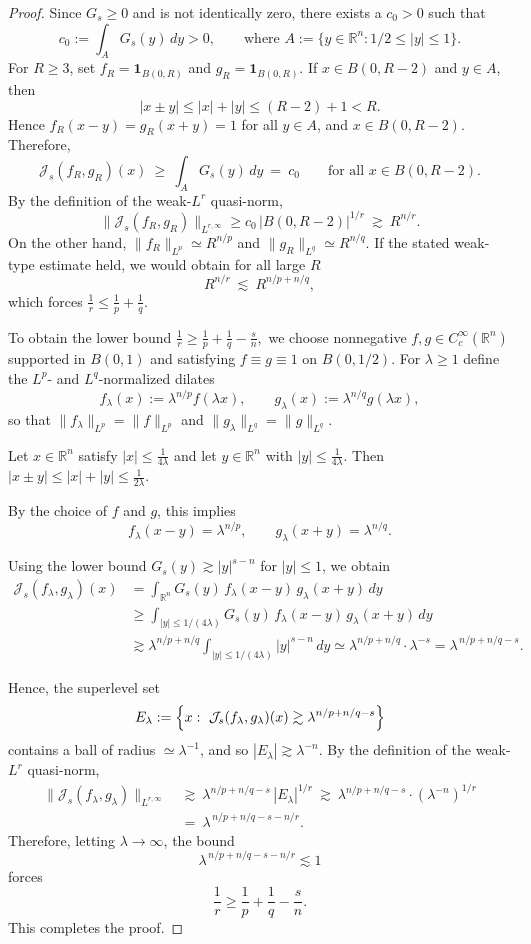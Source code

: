 \documentclass[12pt]{article}
\theoremstyle{definition}
\theoremstyle{remark}
\numberwithin{equation}{section}
\begin{document}
\begin{proof}
Since $G_s\ge 0$ and is not identically zero, there exists a $c_0>0$ such that
\[
c_0:=\int_A G_s(y)\,dy>0,\qquad\text{where } A:=\{y\in\mathbb R^n: 1/2\le |y|\le 1\}.
\]
For $R\ge 3$, set $f_R=\mathbf 1_{B(0,R)}$ and $g_R=\mathbf 1_{B(0,R)}$.
If $x\in B(0,R-2)$ and $y\in A$, then
\[
|x\pm y|\le |x|+|y|\le (R-2)+1<R.
\]
Hence $f_R(x-y)=g_R(x+y)=1$ for all $y\in A$, and $x\in B(0, R-2).$ Therefore,
\[
\mathcal J_s(f_R,g_R)(x)\ \ge\ \int_A G_s(y)\,dy\ =\ c_0
\qquad\text{for all }x\in B(0,R-2).
\]
By the definition of the weak-$L^r$ quasi-norm,
\[
\|\mathcal J_s(f_R,g_R)\|_{L^{r,\infty}}
\ge c_0\,|B(0,R-2)|^{1/r}\ \gtrsim\ R^{n/r}.
\]
On the other hand, $\|f_R\|_{L^p}\simeq R^{n/p}$ and $\|g_R\|_{L^q}\simeq R^{n/q}$.
If the stated weak-type estimate held, we would obtain for all large $R$
\[
R^{n/r}\ \lesssim\ R^{n/p+n/q},
\]
which forces $\frac1r\le \frac1p+\frac1q$.

To obtain the lower bound
\(
\frac1r \ge \frac1p+\frac1q-\frac{s}{n},
\)
we choose nonnegative $f,g\in C_c^\infty(\mathbb R^n)$ supported in $B(0,1)$ and satisfying
$f\equiv g\equiv 1$ on $B(0,1/2)$. For $\lambda\ge 1$ define the $L^p$- and $L^q$-normalized dilates
\[
f_\lambda(x):=\lambda^{n/p}f(\lambda x),
\qquad
g_\lambda(x):=\lambda^{n/q}g(\lambda x),
\]
so that $\|f_\lambda\|_{L^p}=\|f\|_{L^p}$ and $\|g_\lambda\|_{L^q}=\|g\|_{L^q}$.

Let $x\in \mathbb R^n$ satisfy $|x|\le \frac{1}{4\lambda}$ and let
$y\in \mathbb R^n$ with $|y|\le \frac{1}{4\lambda}$.
Then
$|x\pm y|\le |x|+|y|\le \frac{1}{2\lambda}$.

By the choice of $f$ and $g$, this implies
\[
f_\lambda(x-y)=\lambda^{n/p},
\qquad
g_\lambda(x+y)=\lambda^{n/q}.
\]

Using the lower bound $G_s(y)\gtrsim |y|^{s-n}$ for $|y|\le 1$, we obtain
\begin{align*}
\mathcal J_s(f_\lambda,g_\lambda)(x)
&=\int_{\mathbb R^n} G_s(y)\,f_\lambda(x-y)\,g_\lambda(x+y)\,dy\\
&\ge
\int_{|y|\le 1/(4\lambda)} G_s(y)\,f_\lambda(x-y)\,g_\lambda(x+y)\,dy\\
&\gtrsim
\lambda^{n/p+n/q}
\int_{|y|\le 1/(4\lambda)} |y|^{s-n}\,dy\simeq
\lambda^{n/p+n/q}\cdot \lambda^{-s}
=
\lambda^{\,n/p+n/q-s}.
\end{align*}


Hence, the superlevel set
\[
E_\lambda:=\Bigl\{x:\ \mathcal J_s(f_\lambda,g_\lambda)(x)\gtrsim \lambda^{n/p+n/q-s}\Bigr\}
\]
contains a ball of radius $\simeq \lambda^{-1}$, and so $|E_\lambda|\gtrsim \lambda^{-n}$.
By the definition of the weak-$L^r$ quasi-norm,
\begin{align*}
\|\mathcal J_s(f_\lambda,g_\lambda)\|_{L^{r,\infty}}
\ &\gtrsim\ \lambda^{n/p+n/q-s}\,|E_\lambda|^{1/r}
\ \gtrsim\ \lambda^{n/p+n/q-s}\cdot (\lambda^{-n})^{1/r}\\
\ &=\ \lambda^{\,n/p+n/q-s-n/r}.
\end{align*}
Therefore,
letting $\lambda\to\infty$, the bound
\[
\lambda^{\,n/p+n/q-s-n/r}\lesssim 1
\]
forces
\[
\frac{1}{r}\ge \frac{1}{p}+\frac{1}{q}-\frac{s}{n}.
\]
This completes the proof.
\end{proof}
\end{document}
